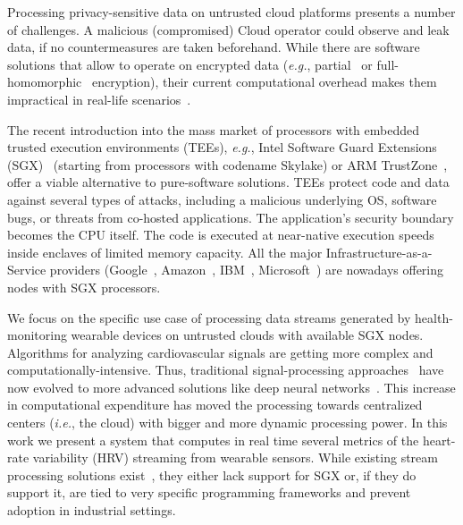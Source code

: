 Processing privacy-sensitive data on untrusted cloud platforms presents a number of challenges.
A malicious (compromised) Cloud operator could observe and leak data, if no countermeasures are taken beforehand.
While there are software solutions that allow to operate on encrypted data (\emph{e.g.}, partial~\cite{Paillier1999} or full-homomorphic~\cite{Gentry2012} encryption), their current computational overhead makes them impractical in real-life scenarios~\cite{Gottel2018S}.

The recent introduction into the mass market of processors with embedded trusted execution environments (TEEs), \emph{e.g.}, Intel Software Guard Extensions (SGX)~\cite{Costan2016} (starting from processors with codename Skylake) or ARM TrustZone~\cite{trustzone}, offer a viable alternative to pure-software solutions.
TEEs protect code and data against several types of attacks, including a malicious underlying OS, software bugs, or threats from co-hosted applications.
The application's security boundary becomes the CPU itself.
The code is executed at near-native execution speeds inside enclaves of limited memory capacity.
All the major Infrastructure-as-a-Service providers (Google~\cite{gceskylake}, Amazon~\cite{amazonskylake}, IBM~\cite{ibm-sgx}, Microsoft~\cite{azureconfidential}) are nowadays offering nodes with SGX processors.

We focus on the specific use case of processing data streams generated by health-monitoring wearable devices on untrusted clouds with available SGX nodes.
Algorithms for analyzing cardiovascular signals are getting more complex and computationally-intensive.
Thus, traditional signal-processing approaches~\cite{Kumar2016} have now evolved to more advanced solutions like deep neural networks~\cite{Xiong2018,VanZaen2019}.
This increase in computational expenditure has moved the processing towards centralized centers (\textit{i.e.}, the cloud) with bigger and more dynamic processing power. %
In this work we present a system that computes in real time several metrics of the heart-rate variability (HRV) streaming from wearable sensors.
While existing stream processing solutions exist~\cite{spark-streaming-documentation,Havet2017}, they either lack support for SGX or, if they do support it, are tied to very specific programming frameworks and prevent adoption in industrial settings.

